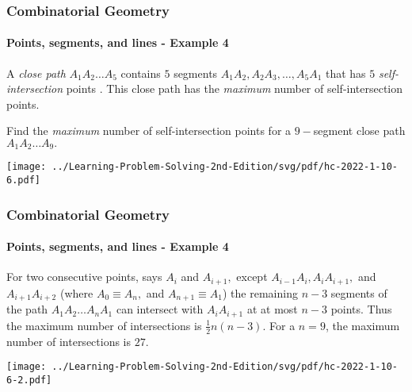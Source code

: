 \documentclass[8pt,xcolor=table,dvipsnames]{beamer}
\providecommand{\half}{\frac{1}{2}}
\begin{document}
\begin{frame}[t]
    \frametitle{Combinatorial Geometry}
    \framesubtitle{Points, segments, and lines - Example 4}
    \begin{example}[HC-2022-SM1-R10-P6]
        A \textit{close path} $A_1A_2 \ldots A_5$ contains $5$ segments $A_1A_2, A_2A_3, \ldots, A_5A_1$
        that has $5$ \textit{self-intersection} points .
        This close path has the \textit{maximum} number of self-intersection points.
        
        Find the \textit{maximum} number of self-intersection points
        for a $9-$segment close path $A_1A_2 \ldots A_9.$
    \end{example}
    \begin{center}
        \texttt{[image: ../Learning-Problem-Solving-2nd-Edition/svg/pdf/hc-2022-1-10-6.pdf]}
    \end{center}
\end{frame}

\begin{frame}[t]
    \frametitle{Combinatorial Geometry}
    \framesubtitle{Points, segments, and lines - Example 4}
    For two consecutive points, says $A_i$ and $A_{i+1},$ 
    except $A_{i-1} A_i, A_i A_{i+1},$ and $A_{i+1} A_{i+2}$ (where $A_0 \equiv A_n,$ and $A_{n+1} \equiv A_1$)
    the remaining $n-3$ segments of the path $A_1 A_2 \ldots A_n A_1$ 
    can intersect with $A_i A_{i+1}$ at at most $n-3$ points. 
    Thus the maximum number of intersections is $\half n(n-3).$
    For a $n=9$, the maximum number of intersections is $\boxed{27.}$
    \begin{center}
        \texttt{[image: ../Learning-Problem-Solving-2nd-Edition/svg/pdf/hc-2022-1-10-6-2.pdf]}
    \end{center}
\end{frame}
\end{document}
